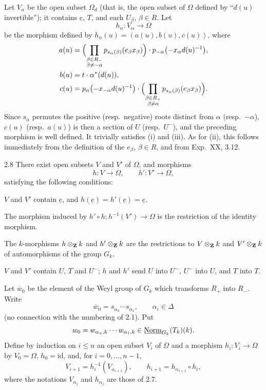 Let $V_\alpha$ be the open subset $\Omega_d$ (that is, the open subset of $\Omega$ defined by ``$d(u)$ invertible''); it contains $\underline e$, $T$, and each $U_\beta$, $\beta\in R$. Let
\[
h_\alpha:V_\alpha\to\Omega
\]
be the morphism defined by $h_\alpha(u)=(a(u),b(u),c(u))$, where
\[
\begin{aligned}
a(u)&=\Bigl(\prod_{\substack{\beta\in R_-\\\beta\ne-\alpha}}p_{s_\alpha(\beta)}(e_\beta x_\beta)\Bigr)\cdot p_{-\alpha}\bigl(-x_\alpha d(u)^{-1}\bigr),\\
b(u)&=t\cdot\alpha^*(d(u)),\\
c(u)&=p_\alpha\bigl(-x_{-\alpha}d(u)^{-1}\bigr)\cdot\Bigl(\prod_{\substack{\beta\in R_+\\\beta\ne\alpha}}p_{s_\alpha(\beta)}(e_\beta x_\beta)\Bigr).
\end{aligned}
\]
Since $s_\alpha$ permutes the positive (resp.~negative) roots distinct from $\alpha$ (resp.~$-\alpha$), $c(u)$ (resp.~$a(u)$) is then a section of $U$ (resp.~$U^-$), and the preceding morphism is well defined. It trivially satisfies (i) and (iii). As for (ii), this follows immediately from the definition of the $e_\beta$, $\beta\in R$, and from Exp.~XX, 3.12.

\begin{lemma}{2.8}\label{XXV.2.8}
There exist open subsets $V$ and $V'$ of $\Omega$, and morphisms
\[
h:V\to\Omega,\qquad h':V'\to\Omega,
\]
satisfying the following conditions:
\begin{enumeratei}
\item $V$ and $V'$ contain $\underline e$, and $h(\underline e)=h'(\underline e)=\underline e$.
\item The morphism induced by $h'\circ h:h^{-1}(V')\to\Omega$ is the restriction of the identity morphism.
\item The $k$-morphisms $h\otimes_{\mathbf{Z}} k$ and $h'\otimes_{\mathbf{Z}} k$ are the restrictions to $V\otimes_{\mathbf{Z}} k$ and $V'\otimes_{\mathbf{Z}} k$ of automorphisms of the group $G_k$.
\item $V$ and $V'$ contain $U$, $T$ and $U^-$; $h$ and $h'$ send $U$ into $U^-$, $U^-$ into $U$, and $T$ into $T$.
\end{enumeratei}
\end{lemma}
Let $\overline w_0$ be the element of the Weyl group of $G_k$ which transforms $R_+$ into $R_-$. Write
\[
\overline w_0=s_{\alpha_n}\cdots s_{\alpha_1},\qquad\alpha_i\in\Delta
\]
(no connection with the numbering of 2.1). Put
\[
w_0=w_{\alpha_n,k}\cdots w_{\alpha_1,k}\in\underline{\mathrm{Norm}}_{G_k}(T_k)(k).
\]
Define by induction on $i\le n$ an open subset $V_i$ of $\Omega$ and a morphism $h_i:V_i\to\Omega$ by $V_0=\Omega$, $h_0=\mathrm{id}$, and, for $i=0,\ldots,n-1$,
\[
V_{i+1}=h_i^{-1}(V_{\alpha_{i+1}}),\qquad h_{i+1}=h_{\alpha_{i+1}}\circ h_i,
\]
where the notations $V_{\alpha_j}$ and $h_{\alpha_j}$ are those of 2.7.

